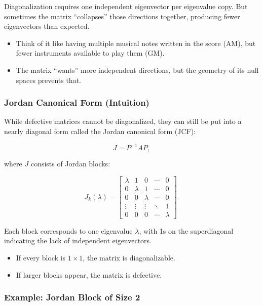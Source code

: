 \documentclass[
  letterpaper,
  DIV=11,
  numbers=noendperiod]{scrreprt}
\providecommand{\tightlist}{%
  \setlength{\itemsep}{0pt}\setlength{\parskip}{0pt}}
\begin{document}
Diagonalization requires one independent eigenvector per eigenvalue
copy. But sometimes the matrix ``collapses'' those directions together,
producing fewer eigenvectors than expected.

\begin{itemize}
\tightlist
\item
  Think of it like having multiple musical notes written in the score
  (AM), but fewer instruments available to play them (GM).
\item
  The matrix ``wants'' more independent directions, but the geometry of
  its null spaces prevents that.
\end{itemize}

\subsubsection{Jordan Canonical Form
(Intuition)}\label{jordan-canonical-form-intuition}

While defective matrices cannot be diagonalized, they can still be put
into a nearly diagonal form called the Jordan canonical form (JCF):

\[
J = P^{-1} A P,
\]

where \(J\) consists of Jordan blocks:

\[
J_k(\lambda) = \begin{bmatrix} 
\lambda & 1 & 0 & \cdots & 0 \\
0 & \lambda & 1 & \cdots & 0 \\
0 & 0 & \lambda & \cdots & 0 \\
\vdots & \vdots & \vdots & \ddots & 1 \\
0 & 0 & 0 & \cdots & \lambda
\end{bmatrix}.
\]

Each block corresponds to one eigenvalue \(\lambda\), with 1s on the
superdiagonal indicating the lack of independent eigenvectors.

\begin{itemize}
\tightlist
\item
  If every block is \(1 \times 1\), the matrix is diagonalizable.
\item
  If larger blocks appear, the matrix is defective.
\end{itemize}

\subsubsection{Example: Jordan Block of Size
2}\label{example-jordan-block-of-size-2}
\end{document}
